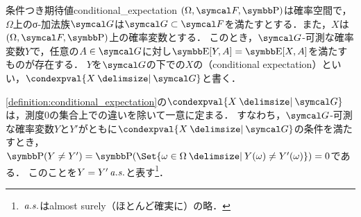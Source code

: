 \documentclass[../../main]{subfiles}
\begin{document}
\begin{definition}{条件つき期待値}{conditional_expectation}
  \((\Omega,\sigmaalg{F},\prob)\)は確率空間で，\(\Omega\)上のσ‐加法族\(\sigmaalg{G}\)は\(\sigmaalg{G}\subset\sigmaalg{F}\)を満たすとする．また，\(X\)は\((\Omega,\sigmaalg{F},\prob)\)上の確率変数とする．
  このとき，\(\sigmaalg{G}\)‐可測な確率変数\(Y\)で，任意の\(A\in\sigmaalg{G}\)に対し\(\expval[Y,A]=\expval[X,A]\)を満たすものが存在する\footnotemark ．
  \(Y\)を\(\sigmaalg{G}\)の下での\(X\)の（conditional expectation）といい，\(\condexpval{X\given\sigmaalg{G}}\)と書く．
\end{definition}

\cref{definition:conditional_expectation}の\(\condexpval{X\given\sigmaalg{G}}\)は，測度\(0\)の集合上での違いを除いて一意に定まる．
すなわち，\(\sigmaalg{G}\)‐可測な確率変数\(Y\)と\(Y'\)がともに\(\condexpval{X\given\sigmaalg{G}}\)の条件を満たすとき，\(\prob(Y\neq Y')=\prob(\Set{\omega\in\Omega\given Y(\omega)\neq Y'(\omega)})=0\)である．
このことを\(\almostsurely{Y=Y'}\)と表す\footnote{\(\almostsurely{}\)はalmost surely（ほとんど確実に）の略．}．
\end{document}
